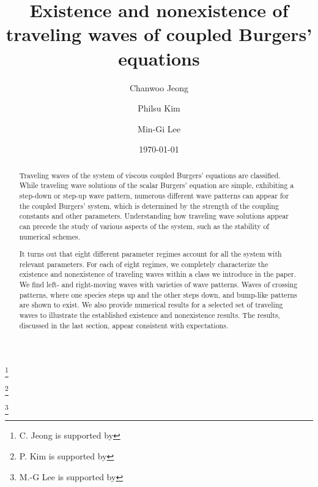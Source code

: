 \documentclass{amsart}
\def\blue{\color{blue}}
\theoremstyle{definition}
\numberwithin{equation}{section}
\begin{document}
\title{Existence and nonexistence of traveling waves of coupled Burgers' equations}

\author{Chanwoo Jeong}
\address{Department of Mathematics, Kyungpook National University, Daegu, South Korea}
\thanks{C. Jeong is supported by }

\author{Philsu Kim}
\address{Department of Mathematics, Kyungpook National University, Daegu, South Korea}
\thanks{P. Kim is supported by }

\author{Min-Gi Lee}
\address{Department of Mathematics, Kyungpook National University, Daegu, South Korea}
\thanks{M.-G Lee is supported by }


\date{\today}




\date{}


\begin{abstract}
 Traveling waves of the system of viscous coupled Burgers' equations are classified. While traveling wave solutions of the scalar Burgers' equation are simple, exhibiting a step-down or step-up wave pattern, numerous different wave patterns can appear for the coupled Burgers' system, which is determined by the strength of the coupling constants and other parameters. {\blue Understanding how traveling wave solutions appear can precede the study of various aspects of the system, such as the stability of numerical schemes.} 
 
 It turns out that eight different parameter regimes account for all the system with relevant parameters. For each of eight regimes, we completely characterize the existence and nonexistence of traveling waves within a class we introduce in the paper. We find left- and right-moving waves with varieties of wave patterns. Waves of crossing patterns, where one species steps up and the other steps down, and bump-like patterns are shown to exist. We also provide numerical results for a selected set of traveling waves to illustrate the established existence and nonexistence results. The results, discussed in the last section, appear consistent with expectations.
\end{abstract}
\maketitle
\end{document}
